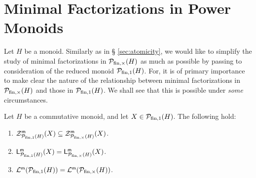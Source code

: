 \section{Minimal Factorizations in Power Monoids}
\label{subsec:min-factorization-in-PMs}
%
Let $H$ be a monoid. Similarly as in \S{ }\ref{sec:atomicity}, we would like to simplify the study of minimal factorizations in $\mathcal{P}_{\textrm{fin}, \times}(H)$ as much as possible by passing to consideration of the reduced monoid $\mathcal{P}_{\textrm{fin}, 1}(H)$. For, it is of primary importance to make clear the nature of the relationship between minimal factorizations in $\mathcal{P}_{\textrm{fin}, \times}(H)$ and those in $\mathcal{P}_{\textrm{fin}, 1}(H)$.
We shall see that this is possible under \emph{some} circumstances. 
%
\begin{prop}\label{prop:comm-pm}
	Let $H$ be a commutative monoid, and let $X\in \mathcal{P}_{\textrm{fin},1}(H)$. The following hold:
	\begin{enumerate}[label = {\rm (\roman{*})}]
		\item\label{it:prop:comm-pm(i)} $\mathcal{Z}_{\mathcal{P}_{\textrm{fin},1}(H)}^{\mathsf{m}}(X) \subseteq \mathcal{Z}_{\mathcal{P}_{{\textrm{fin}, \times}}(H)}^{\mathsf{m}}(X)$.
		\item\label{it:prop:comm-pm(ii)} $\mathsf{L}_{\mathcal{P}_{\textrm{fin},1}(H)}^{\mathsf{m}}(X) = \mathsf{L}_{\mathcal{P}_{\textrm{fin}, \times}(H)}^{\mathsf{m}}(X)$.
		\item\label{it:prop:comm-pm(iii)} $\mathcal{L}^{\mathsf{m}}(\mathcal{P}_{\textrm{fin},1}(H)) = \mathcal{L}^{\mathsf{m}}(\mathcal{P}_{\textrm{fin}, \times}(H))$.
	\end{enumerate}
\end{prop}
%
